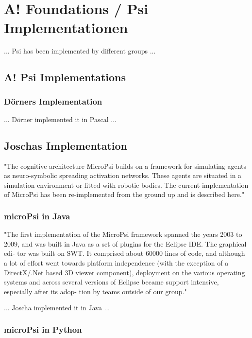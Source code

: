 \chapter{A! Foundations / Psi Implementationen}

... Psi has been implemented by different groups ...

\section{A! Psi Implementations}

\subsection{Dörners Implementation}

... Dörner implemented it in Pascal ...

\section{Joschas Implementation}

"The cognitive architecture MicroPsi builds on a framework for simulating agents as neuro-symbolic spreading activation networks. These agents are situated in a simulation environment or fitted with robotic bodies. The current implementation of MicroPsi has been re-implemented from the ground up and is described here."~\cite{conf/agi/Bach12}

\subsection{microPsi in Java}

"The first implementation of the MicroPsi framework spanned the years 2003 to 2009, and was built in Java as a set of plugins for the Eclipse IDE. The graphical edi- tor was built on SWT. It comprised about 60000 lines of code, and although a lot of effort went towards platform independence (with the exception of a DirectX/.Net based 3D viewer component), deployment on the various operating systems and across several versions of Eclipse became support intensive, especially after its adop- tion by teams outside of our group."~\cite{conf/agi/Bach12}

... Joscha implemented it in Java ...

\subsection{microPsi in Python}

